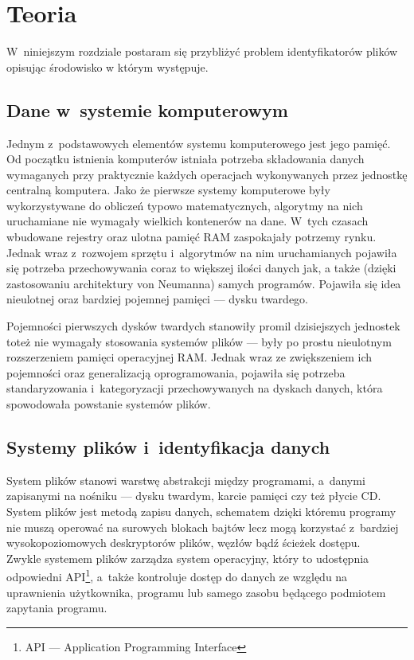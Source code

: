 \chapter{Teoria}
\label{teoria}
\par
W~niniejszym rozdziale postaram się przybliżyć problem identyfikatorów plików opisując środowisko w którym występuje.

\section{Dane w~systemie komputerowym}
\par
Jednym z~podstawowych elementów systemu komputerowego jest jego pamięć. Od początku istnienia komputerów istniała potrzeba składowania danych wymaganych przy praktycznie każdych operacjach wykonywanych przez jednostkę centralną komputera. Jako że pierwsze systemy komputerowe były wykorzystywane do obliczeń typowo matematycznych, algorytmy na nich uruchamiane nie wymagały wielkich kontenerów na dane. W~tych czasach wbudowane rejestry oraz ulotna pamięć RAM zaspokajały potrzemy rynku. Jednak wraz z~rozwojem sprzętu i~algorytmów na nim uruchamianych pojawiła się potrzeba przechowywania coraz to większej ilości danych jak, a także (dzięki zastosowaniu architektury von Neumanna) samych programów. Pojawiła się idea nieulotnej oraz bardziej pojemnej pamięci --- dysku twardego.\\

\par
Pojemności pierwszych dysków twardych stanowiły promil dzisiejszych jednostek toteż nie wymagały stosowania systemów plików --- były po prostu nieulotnym rozszerzeniem pamięci operacyjnej RAM. Jednak wraz ze zwiększeniem ich pojemności oraz generalizacją oprogramowania, pojawiła się potrzeba standaryzowania i~kategoryzacji przechowywanych na dyskach danych, która spowodowała powstanie systemów plików.

\section{Systemy plików i~identyfikacja danych}
\par
System plików stanowi warstwę abstrakcji między programami, a~danymi zapisanymi na nośniku --- dysku twardym, karcie pamięci czy też płycie CD. System plików jest metodą zapisu danych, schematem dzięki któremu programy nie muszą operować na surowych blokach bajtów lecz mogą korzystać z~bardziej wysokopoziomowych deskryptorów plików, węzłów bądź ścieżek dostępu.\\
Zwykle systemem plików zarządza system operacyjny, który to udostępnia odpowiedni API\footnote{API --- Application Programming Interface}, a~także kontroluje dostęp do danych ze względu na uprawnienia użytkownika, programu lub samego zasobu będącego podmiotem zapytania programu.\\

